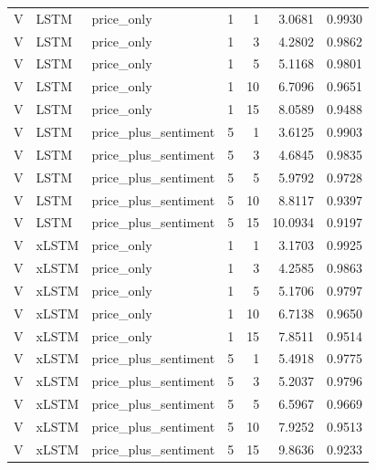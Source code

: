 \begin{longtable}{lllrrrr}
V & LSTM & price_only & 1 & 1 & 3.0681 & 0.9930 \\
V & LSTM & price_only & 1 & 3 & 4.2802 & 0.9862 \\
V & LSTM & price_only & 1 & 5 & 5.1168 & 0.9801 \\
V & LSTM & price_only & 1 & 10 & 6.7096 & 0.9651 \\
V & LSTM & price_only & 1 & 15 & 8.0589 & 0.9488 \\
V & LSTM & price_plus_sentiment & 5 & 1 & 3.6125 & 0.9903 \\
V & LSTM & price_plus_sentiment & 5 & 3 & 4.6845 & 0.9835 \\
V & LSTM & price_plus_sentiment & 5 & 5 & 5.9792 & 0.9728 \\
V & LSTM & price_plus_sentiment & 5 & 10 & 8.8117 & 0.9397 \\
V & LSTM & price_plus_sentiment & 5 & 15 & 10.0934 & 0.9197 \\
V & xLSTM & price_only & 1 & 1 & 3.1703 & 0.9925 \\
V & xLSTM & price_only & 1 & 3 & 4.2585 & 0.9863 \\
V & xLSTM & price_only & 1 & 5 & 5.1706 & 0.9797 \\
V & xLSTM & price_only & 1 & 10 & 6.7138 & 0.9650 \\
V & xLSTM & price_only & 1 & 15 & 7.8511 & 0.9514 \\
V & xLSTM & price_plus_sentiment & 5 & 1 & 5.4918 & 0.9775 \\
V & xLSTM & price_plus_sentiment & 5 & 3 & 5.2037 & 0.9796 \\
V & xLSTM & price_plus_sentiment & 5 & 5 & 6.5967 & 0.9669 \\
V & xLSTM & price_plus_sentiment & 5 & 10 & 7.9252 & 0.9513 \\
V & xLSTM & price_plus_sentiment & 5 & 15 & 9.8636 & 0.9233 \\
\end{longtable}
